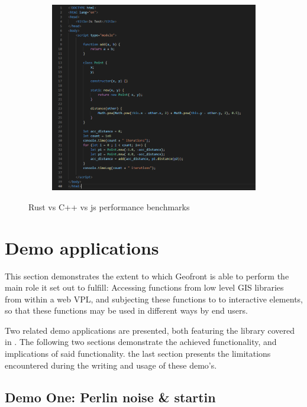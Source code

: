 \begin{figure}
\begin{subfigure}[b]{0.32\linewidth}
    \centering
    \includegraphics[width=\linewidth]{js.PNG}
    \caption{}
  \end{subfigure}%
  \caption[benchmark]{Rust vs C++ vs js performance benchmarks}
  \label{fig:perf-benchmark}
\end{figure}


\section{Demo applications}
\label{sec:testing:demo}
This section demonstrates the extent to which Geofront is able to perform the main role it set out to fulfill: 
Accessing functions from low level \ac{GIS} libraries from within a web VPL, and subjecting these functions to to interactive elements, so that these functions may be used in different ways by end users.

Two related demo applications are presented, both featuring the  library covered in .
The following two sections demonstrate the achieved functionality, and implications of said functionality. 
the last section presents the limitations encountered during the writing and usage of these demo's.

\subsection{Demo One: Perlin noise \& startin}

